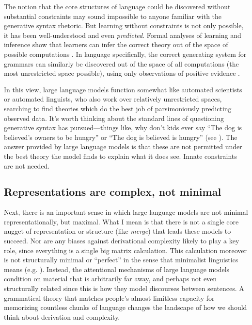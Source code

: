 \documentclass[output=paper,colorlinks,citecolor=brown
]{langscibook}
\begin{document}
The notion that the core structures of language could be discovered without substantial constraints may sound impossible to anyone familiar with the generative syntax rhetoric. But learning without constraints is not only possible, it has been well-understood and even \emph{predicted}. Formal analyses of learning and inference show that learners can infer the correct theory out of the space of possible computations \citep{solomonoff1964formal,hutter2004universal,legg2007universal}. In language specifically, the correct generating system for grammars can similarly be discovered out of the space of all computations (the most unrestricted space possible), using only observations of positive evidence \citep{chater2007ideal}.

In this view, large language models function somewhat like automated scientists or automated linguists, who also work over relatively unrestricted spaces, searching to find theories which do the best job of parsimoniously predicting observed data. It's worth thinking about the standard lines of questioning generative syntax has pursued---things like, why don't kids ever say ``The dog is believed's owners to be hungry'' or ``The dog is believed is hungry'' (see \cite{lasnik2016argument}). The answer provided by large language models is that these are not permitted under the best theory the model finds to explain what it does see. Innate constraints are not needed.


\subsection{Representations are complex, not minimal}

Next, there is an important sense in which large language models are not minimal representationally, but maximal. What I mean is that there is not a single core nugget of representation or structure (like \emph{merge}) that leads these models to succeed. Nor are any biases against derivational complexity likely to play a key role, since everything is a single big matrix calculation. This calculation moreover is not structurally minimal or ``perfect'' in the sense that minimalist linguistics means (e.g. \cite{lasnik2002minimalist}). Instead, the attentional mechanisms of large language models condition on material that is arbitrarily far away, and perhaps not even structurally related since this is how they model discourses between sentences. A grammatical theory that matches people's almost limitless capacity for memorizing countless chunks of language changes the landscape of how we should think about derivation and complexity. 
\end{document}
